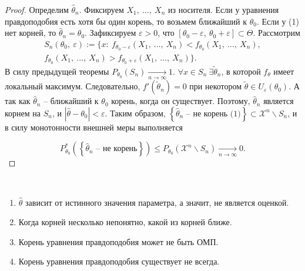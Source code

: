 \begin{proof}
    Определим $\displaystyle \hat{\theta }_{n}$. Фиксируем $\displaystyle X_{1} ,\ \dotsc ,\ X_{n}$ из носителя. Если у уравнения правдоподобия есть хотя бы один корень, то возьмем ближайший к $\displaystyle \theta _{0}$. Если у (1) нет корней, то $\displaystyle \hat{\theta }_{n} =\theta _{0}$. Зафиксируем $\displaystyle \varepsilon  >0$, что $\displaystyle [ \theta _{0} -\varepsilon ,\ \theta _{0} +\varepsilon ] \subset \Theta $. Рассмотрим
    \begin{gather*}
        S_{n}( \theta _{0} ,\ \varepsilon ) :=\{x:\ f_{\theta _{0} -\varepsilon }( X_{1} ,\ \dotsc ,\ X_{n}) < f_{\theta _{0}}( X_{1} ,\ \dotsc ,\ X_{n}) ,\\
        f_{\theta _{0}}( X_{1} ,\ \dotsc ,\ X_{n})  >f_{\theta _{0} +\varepsilon }( X_{1} ,\ \dotsc ,\ X_{n})\} .
    \end{gather*}
    В силу предыдущей теоремы $\displaystyle P_{\theta _{0}}( S_{n})\xrightarrow[n\rightarrow \infty ]{} 1$. $\displaystyle \forall x\in S_{n} \ \exists \tilde{\theta }_{n}$, в которой $\displaystyle f_{\theta }$ имеет локальный максимум. Следовательно, $\displaystyle f'\left(\tilde{\theta }_{n}\right) =0$ при некотором $\displaystyle \tilde{\theta } \in U_{\varepsilon }( \theta _{0})$. А так как $\displaystyle \hat{\theta }_{n}$ -- ближайший к $\displaystyle \theta _{0}$ корень, когда он существует. Поэтому, $\displaystyle \hat{\theta }_{n}$ является корнем на $\displaystyle S_{n}$, и $\displaystyle | \hat{\theta } -\theta _{0}| < \varepsilon $. Таким образом, $\displaystyle \left\{\hat{\theta }_{n}\text{ -- не корень (1)}\right\} \subset \mathcal{X}^{n} \backslash S_{n}$, и в силу монотонности внешней меры выполняется
    
    
    \begin{equation*}
        P_{\theta _{0}}^{*}\left(\left\{\hat{\theta }_{n}\text{ -- не корень}\right\}\right) \leqslant P_{\theta _{0}}\left(\mathcal{X}^{n} \backslash S_{n}\right)\xrightarrow[n\rightarrow \infty ]{} 0.
    \end{equation*}
\end{proof}
\begin{note} ~
    \begin{enumerate}
        \item $\displaystyle \hat{\theta }$ зависит от истинного значения параметра, а значит, не является оценкой.

        \item Когда корней несколько непонятно, какой из корней ближе.
        
        \item Корень уравнения правдоподобия может не быть ОМП.
        
        \item Корень уравнения правдоподобия существует не всегда.
    \end{enumerate}

\end{note}